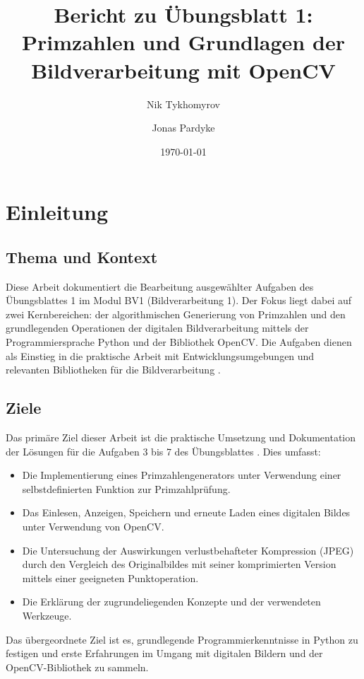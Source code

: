 \documentclass[11pt, a4paper]{article}
\title{Bericht zu Übungsblatt 1: \\ Primzahlen und Grundlagen der Bildverarbeitung mit OpenCV}
\author{Nik Tykhomyrov \and Jonas Pardyke}
\date{\today} %
\begin{document}
\maketitle

\tableofcontents
\newpage

\section{Einleitung}

\subsection{Thema und Kontext}
Diese Arbeit dokumentiert die Bearbeitung ausgewählter Aufgaben des Übungsblattes 1 im Modul BV1 (Bildverarbeitung 1). Der Fokus liegt dabei auf zwei Kernbereichen: der algorithmischen Generierung von Primzahlen und den grundlegenden Operationen der digitalen Bildverarbeitung mittels der Programmiersprache Python und der Bibliothek OpenCV. Die Aufgaben dienen als Einstieg in die praktische Arbeit mit Entwicklungsumgebungen und relevanten Bibliotheken für die Bildverarbeitung \cite{opencv}.

\subsection{Ziele}
Das primäre Ziel dieser Arbeit ist die praktische Umsetzung und Dokumentation der Lösungen für die Aufgaben 3 bis 7 des Übungsblattes \cite{uebungsblatt}. Dies umfasst:
\begin{itemize}
    \item Die Implementierung eines Primzahlengenerators unter Verwendung einer selbstdefinierten Funktion zur Primzahlprüfung.
    \item Das Einlesen, Anzeigen, Speichern und erneute Laden eines digitalen Bildes unter Verwendung von OpenCV.
    \item Die Untersuchung der Auswirkungen verlustbehafteter Kompression (JPEG) durch den Vergleich des Originalbildes mit seiner komprimierten Version mittels einer geeigneten Punktoperation.
    \item Die Erklärung der zugrundeliegenden Konzepte und der verwendeten Werkzeuge.
\end{itemize}
Das übergeordnete Ziel ist es, grundlegende Programmierkenntnisse in Python zu festigen und erste Erfahrungen im Umgang mit digitalen Bildern und der OpenCV-Bibliothek zu sammeln.
\end{document}
